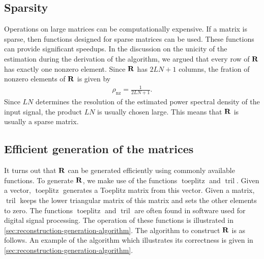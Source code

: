 \documentclass[a4paper, openany, oneside]{memoir}
\begin{document}
\subsection{Sparsity}
\label{sub:reconstruction-sparsity}
Operations on large matrices can be computationally expensive. If a matrix is sparse, then functions designed for sparse matrices can be used. These functions can provide significant speedups. In the discussion on the unicity of the estimation during the derivation of the algorithm, we argued that every row of $\boldsymbol{\mathbf{R}}$ has exactly one nonzero element. Since $\boldsymbol{\mathbf{R}}$ has $2LN+1$ columns, the fration of nonzero elements of $\boldsymbol{\mathbf{R}}$ is given by
\begin{align*}
    \rho_{\text{nz}}=\frac{1}{2LN+1}.
\end{align*}
Since $LN$ determines the resolution of the estimated power spectral density of the input signal, the product $LN$ is usually chosen large. This means that $\boldsymbol{\mathbf{R}}$ is usually a sparse matrix.

\subsection{Efficient generation of the matrices}
\label{sub:reconstruction-generation}
It turns out that $\boldsymbol{\mathbf{R}}$ can be generated efficiently using commonly available functions. To generate $\boldsymbol{\mathbf{R}}$, we make use of the functions $\operatorname{toeplitz}$ and $\operatorname{tril}$. Given a vector, $\operatorname{toeplitz}$ generates a Toeplitz matrix from this vector. Given a matrix, $\operatorname{tril}$ keeps the lower triangular matrix of this matrix and sets the other elements to zero. The functions $\operatorname{toeplitz}$ and $\operatorname{tril}$ are often found in software used for digital signal processing. The operation of these functions is illustrated in \cref{sec:reconstruction-generation-algorithm}. The algorithm to construct $\boldsymbol{\mathbf{R}}$ is as follows. An example of the algorithm which illustrates its correctness is given in \cref{sec:reconstruction-generation-algorithm}.
\end{document}
